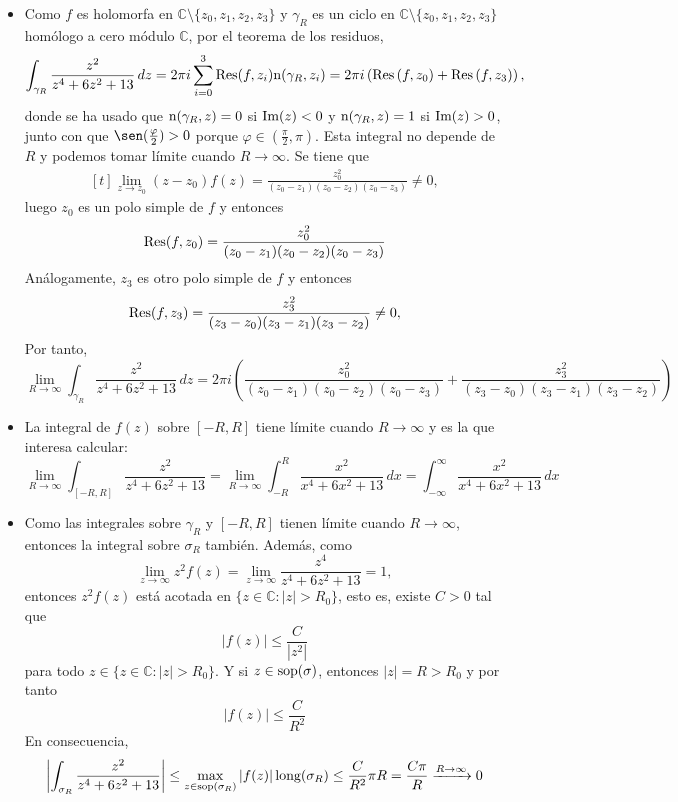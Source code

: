 \documentclass[11pt]{report}
\makeatletter
\renewenvironment{proof}[1][\proofname]{\par
  \pushQED{\qed}%
  \normalfont \topsep\z@skip %
  \trivlist
  \item[\hskip\labelsep
        \itshape
    #1\@addpunct{.}]\ignorespaces
}{%
  \popQED\endtrivlist\@endpefalse
}
\newcommand{\C}{\mathbb C}
\makeatother
\begin{document}
\begin{proof}
\begin{enumerate}
  \begin{itemize}
  \item Como $f$ es holomorfa en $\C \setminus \{z_0,z_1,z_2,z_3\}$ y $\gamma_R$ es un ciclo en $\C \setminus \{z_0,z_1,z_2,z_3\}$ homólogo a cero módulo $\C$, por el teorema de los residuos,
  \[\int_{\gamma_R}\frac{z^2}{z^4+6z^2+13} \, dz = 2\pi i \sum_{i=0}^3\textup{Res}(f,z_i)\textup{n}(\gamma_R, z_i) =  2\pi i\left(\textup{Res}\left(f,z_0\right) + \textup{Res}\left(f,z_3\right)\right),\]
  donde se ha usado que $\textup{n}(\gamma_R,z) = 0$ si $\textup{Im}(z) < 0$ y $\textup{n}(\gamma_R,z) = 1$ si $\textup{Im}(z) > 0$, junto con que $\sen(\frac{\varphi}{2})>0$ porque $\varphi \in (\frac{\pi}{2},\pi)$. Esta integral no depende de $R$ y podemos tomar límite cuando $R \to \infty$. Se tiene que
  \[\begin{aligned}[t]
    \lim_{z \to z_0} (z-z_0)f(z)= \frac{z_0^2}{(z_0-z_1)(z_0-z_2)(z_0-z_3)} \neq 0,
  \end{aligned} \]
  luego $z_0$ es un polo simple de $f$ y entonces
  \[\textup{Res}(f,z_0) = \frac{z_0^2}{(z_0-z_1)(z_0-z_2)(z_0-z_3)}\]
  Análogamente, $z_3$ es otro polo simple de $f$ y entonces
  \[\begin{aligned}[t]
    \textup{Res}(f,z_3)= \frac{z_3^2}{(z_3-z_0)(z_3-z_1)(z_3-z_2)} \neq 0,
  \end{aligned}\]
  Por tanto,
  \[\lim_{R \to \infty} \int_{\gamma_R}\frac{z^2}{z^4+6z^2+13} \, dz =2\pi i\left(\frac{z_0^2}{(z_0-z_1)(z_0-z_2)(z_0-z_3)}+\frac{z_3^2}{(z_3-z_0)(z_3-z_1)(z_3-z_2)}\right)\]
  \item La integral de $f(z)$ sobre $[-R,R]$ tiene límite cuando $R \to \infty$ y es la que interesa calcular:
  \[\lim_{R \to \infty} \int_{[-R,R]}\frac{z^2}{z^4+6z^2+13} = \lim_{R \to \infty} \int_{-R}^R \frac{x^2}{x^4+6x^2+13} \, dx = \int_{-\infty}^\infty \frac{x^2}{x^4+6x^2+13} \, dx \]
  \item Como las integrales sobre $\gamma_R$ y $[-R,R]$ tienen límite cuando $R \to \infty$, entonces la integral sobre $\sigma_R$ también. Además,  como
  \[\lim_{z \to \infty}  z^2f(z)=\lim_{z \to \infty}  \frac{z^4}{z^4+6z^2+13} = 1,\]
  entonces $z^2f(z)$ está acotada en $\{z \in \C \colon |z|>R_0\}$, esto es, existe $C >0$ tal que
  \[|f(z)| \leq \frac{C}{|z^2|}\]
  para todo $z \in \{z \in \C \colon |z|>R_0\}$. Y si $z \in \textup{sop}(\sigma)$, entonces $|z|=R>R_0$ y por tanto
  \[|f(z)| \leq \frac{C}{R^2}\] 
  En consecuencia,
  \[\left|\int_{\sigma_R}\frac{z^2}{z^4+6z^2+13}\right| \leq \max_{z \in \textup{sop}(\sigma_R)}|f(z)| \, \textup{long}(\sigma_R) \leq \frac{C}{R^2}\pi R =\frac{C\pi}{R} \xrightarrow[]{R \to \infty} 0\]

\end{itemize}
\end{enumerate}
\end{proof}
\end{document}
